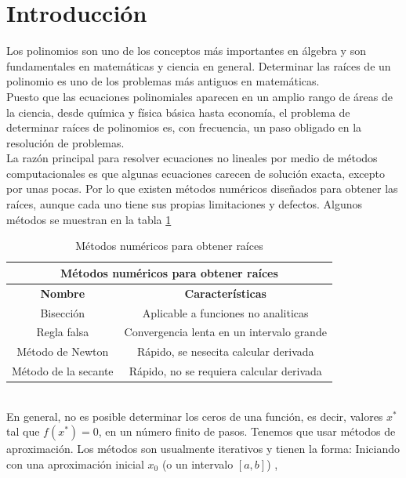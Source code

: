 \documentclass[12pt]{article}
\begin{document}
		\section*{\centering Introducción}\label{sec:Introducción}
			Los polinomios son uno de los conceptos más importantes en álgebra y son fundamentales en 
			matemáticas y ciencia en general. Determinar las raíces de un polinomio es uno de los problemas 
			más antiguos en matemáticas.\\
			Puesto que las ecuaciones polinomiales aparecen en un amplio rango de áreas de la ciencia, desde 
			química y física básica hasta economía, el problema de determinar raíces de polinomios es, con 
			frecuencia, un paso obligado en la resolución de problemas.\cite{bib:item1}\\
			La razón principal para resolver ecuaciones no lineales por medio de métodos computacionales es 
			que algunas ecuaciones carecen de solución exacta, excepto por unas pocas. Por lo que existen 
			métodos numéricos diseñados para obtener las raíces, aunque cada uno tiene sus propias 
			limitaciones y defectos. Algunos métodos se muestran en la tabla \ref{tab:1}\cite{bib:item2}\\
			\begin{table}[h!]
				\centering
				\begin{tabular}{|c|c|}
					\hline
					\multicolumn{2}{|c|}{\textbf{Métodos numéricos para obtener raíces}}\\
					\hline
					\textbf{Nombre} & \textbf{Características} \\\hline
					Bisección & Aplicable a funciones no analiticas \\\hline
					Regla falsa & Convergencia lenta en un intervalo grande \\\hline								
					Método de Newton & Rápido, se nesecita calcular derivada \\\hline
					Método de la secante & Rápido, no se requiera calcular derivada \\\hline
				\end{tabular}
				\caption{Métodos numéricos para obtener raíces \cite{bib:item2}}
				\label{tab:1}
			\end{table}\\
			En general, no es posible determinar los ceros de una función, es decir, valores $ x^* $ tal que $f(x^*) = 0 $, 
			en un número finito de pasos. Tenemos que usar métodos de aproximación. Los métodos son 
			usualmente iterativos y tienen la forma: Iniciando con una aproximación inicial $ x_0 $ (o un intervalo $ [a,b] $) , 
\end{document}

